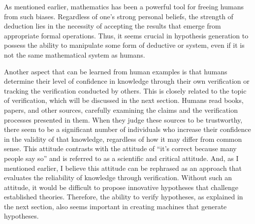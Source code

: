 
As mentioned earlier, mathematics has been a powerful tool for freeing humans from such biases. Regardless of one's strong personal beliefs, the strength of deduction lies in the necessity of accepting the results that emerge from appropriate formal operations. Thus, it seems crucial in hypothesis generation to possess the ability to manipulate some form of deductive or system, even if it is not the same mathematical system as humans.

Another aspect that can be learned from human examples is that humans determine their level of confidence in knowledge through their own verification or tracking the verification conducted by others. This is closely related to the topic of verification, which will be discussed in the next section. Humans read books, papers, and other sources, carefully examining the claims and the verification processes presented in them. When they judge these sources to be trustworthy, there seem to be a significant number of individuals who increase their confidence in the validity of that knowledge, regardless of how it may differ from common sense. This attitude contrasts with the attitude of ``it's correct because many people say so'' and is referred to as a scientific and critical attitude. And, as I mentioned earlier, I believe this attitude can be rephrased as an approach that evaluates the reliability of knowledge through verification. Without such an attitude, it would be difficult to propose innovative hypotheses that challenge established theories. Therefore, the ability to verify hypotheses, as explained in the next section, also seems important in creating machines that generate hypotheses.


